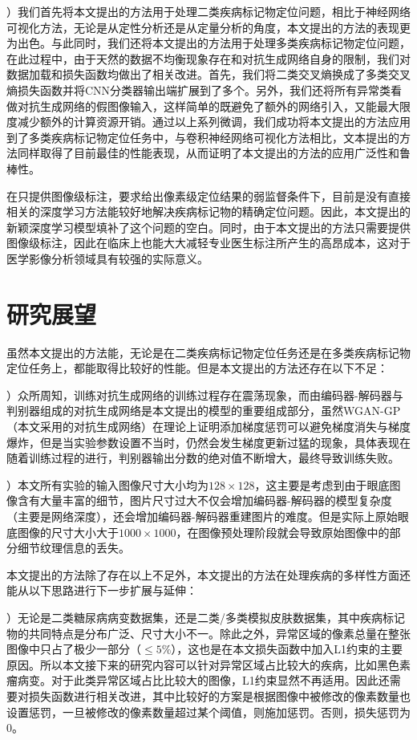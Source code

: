 ）我们首先将本文提出的方法用于处理二类疾病标记物定位问题，相比于神经网络可视化方法，无论是从定性分析还是从定量分析的角度，本文提出的方法的表现更为出色。与此同时，我们还将本文提出的方法用于处理多类疾病标记物定位问题，在此过程中，由于天然的数据不均衡现象存在和对抗生成网络自身的限制，我们对数据加载和损失函数均做出了相关改进。首先，我们将二类交叉熵换成了多类交叉熵损失函数并将CNN分类器输出端扩展到了多个。另外，我们还将所有异常类看做对抗生成网络的假图像输入，这样简单的既避免了额外的网络引入，又能最大限度减少额外的计算资源开销。通过以上系列微调，我们成功将本文提出的方法应用到了多类疾病标记物定位任务中，与卷积神经网络可视化方法相比，文本提出的方法同样取得了目前最佳的性能表现，从而证明了本文提出的方法的应用广泛性和鲁棒性。

在只提供图像级标注，要求给出像素级定位结果的弱监督条件下，目前是没有直接相关的深度学习方法能较好地解决疾病标记物的精确定位问题。因此，本文提出的新颖深度学习模型填补了这个问题的空白。同时，由于本文提出的方法只需要提供图像级标注，因此在临床上也能大大减轻专业医生标注所产生的高昂成本，这对于医学影像分析领域具有较强的实际意义。

\section{研究展望}

虽然本文提出的方法能，无论是在二类疾病标记物定位任务还是在多类疾病标记物定位任务上，都能取得比较好的性能。但是本文提出的方法还存在以下不足：

）众所周知，训练对抗生成网络的训练过程存在震荡现象，而由编码器-解码器与判别器组成的对抗生成网络是本文提出的模型的重要组成部分，虽然WGAN-GP（本文采用的对抗生成网络）在理论上证明添加梯度惩罚可以避免梯度消失与梯度爆炸，但是当实验参数设置不当时，仍然会发生梯度更新过猛的现象，具体表现在随着训练过程的进行，判别器输出分数的绝对值不断增大，最终导致训练失败。

）本文所有实验的输入图像尺寸大小均为$128\times 128$，这主要是考虑到由于眼底图像含有大量丰富的细节，图片尺寸过大不仅会增加编码器-解码器的模型复杂度（主要是网络深度），还会增加编码器-解码器重建图片的难度。但是实际上原始眼底图像的尺寸大小大于$1000\times 1000$，在图像预处理阶段就会导致原始图像中的部分细节纹理信息的丢失。

本文提出的方法除了存在以上不足外，本文提出的方法在处理疾病的多样性方面还能从以下思路进行下一步扩展与延伸：

）无论是二类糖尿病病变数据集，还是二类/多类模拟皮肤数据集，其中疾病标记物的共同特点是分布广泛、尺寸大小不一。除此之外，异常区域的像素总量在整张图像中只占了极少一部分（$\le 5\%$），这也是在本文损失函数中加入L1约束的主要原因。所以本文接下来的研究内容可以针对异常区域占比较大的疾病，比如黑色素瘤病变。对于此类异常区域占比比较大的图像，L1约束显然不再适用。因此还需要对损失函数进行相关改进，其中比较好的方案是根据图像中被修改的像素数量也设置惩罚，一旦被修改的像素数量超过某个阈值，则施加惩罚。否则，损失惩罚为$0$。

